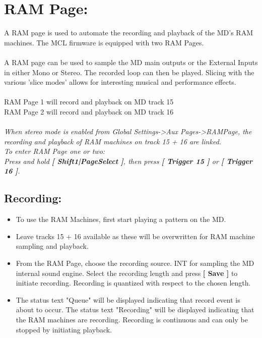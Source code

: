 \chapter{RAM Page:}
A RAM page is used to automate the recording and playback of the MD's RAM machines. The MCL firmware is equipped with two RAM Pages.
\\\\
A RAM page can be used to sample the MD main outputs or the External Inputs in either Mono or Stereo. The recorded loop can then be played.
Slicing with the various 'slice modes' allows for interesting musical and performance effects.
\\\\
RAM Page 1 will record and playback on MD track 15\\
RAM Page 2 will record and playback on MD track 16\\
\\
\textit{When stereo mode is enabled from Global Settings->Aux Pages->RAMPage, the recording and playback of RAM machines on track 15 + 16 are linked.}
\\
\textit{To enter RAM Page one or two: \\Press and hold
\textbf{[ Shift1|PageSelect ]}, then press \textbf{[ Trigger 15 ]} or \textbf{[ Trigger 16 ]}.}

\newpage
\section{Recording:}
\begin{itemize}
    \item{To use the RAM Machines, first start playing a pattern on the MD.}
    \item{Leave tracks 15 + 16 available as these will be overwritten for RAM machine sampling and playback.}
    \item{From the RAM Page, choose the recording source. INT for sampling the MD internal sound engine. Select the recording length and press \textbf{[ Save ]} to initiate recording. Recording is quantized with respect to the chosen length.}
    \item The status text "Queue" will be displayed indicating that record event is about to occur. The status text "Recording" will be displayed indicating that the RAM machines are recording. Recording is continuous and can only be stopped by initiating playback.
\end{itemize}

